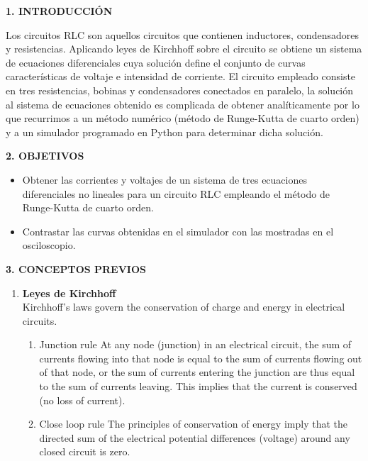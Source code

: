 \documentclass[10pt,a4paper]{article}
\begin{document}
\begin{multicols}{2}
\begin{center}
{\large \bf 1. INTRODUCCI\'ON}
\end{center}
Los circuitos RLC son aquellos circuitos que contienen inductores, condensadores y resistencias. Aplicando leyes de Kirchhoff sobre el circuito se obtiene un sistema de ecuaciones diferenciales cuya solución define el conjunto de curvas características de voltaje e intensidad de corriente. El circuito empleado consiste en tres resistencias, bobinas y condensadores conectados en paralelo, la solución al sistema de ecuaciones obtenido es complicada de obtener analíticamente por lo que recurrimos a un método numérico (método de Runge-Kutta de cuarto orden) y a un simulador programado en Python para determinar dicha solución.

\begin{center}
{\large \bf 2. OBJETIVOS}
\end{center}
\begin{itemize}
\item Obtener las corrientes y voltajes de un sistema de tres ecuaciones diferenciales no lineales para un circuito RLC empleando el método de Runge-Kutta de cuarto orden.
\item Contrastar las curvas obtenidas en el simulador con las mostradas en el osciloscopio.
\end{itemize}

\begin{center}
{\large \bf 3. CONCEPTOS PREVIOS}
\end{center}
\begin{enumerate}
\item \textbf{Leyes de Kirchhoff}\\
Kirchhoff’s laws govern the conservation of charge and energy in electrical circuits.
\begin{enumerate}
\item Junction rule
At any node (junction) in an electrical circuit, the sum of currents flowing into that node is equal to the sum of currents flowing out of that node, or the sum of currents entering the junction are thus equal to the sum of currents leaving. This implies that the current is conserved (no loss of current). 
\item Close loop rule
The principles of conservation of energy imply that the directed sum of the electrical potential differences (voltage) around any closed circuit is zero.
\end{enumerate} 


\end{enumerate}
\end{multicols}
\end{document}

